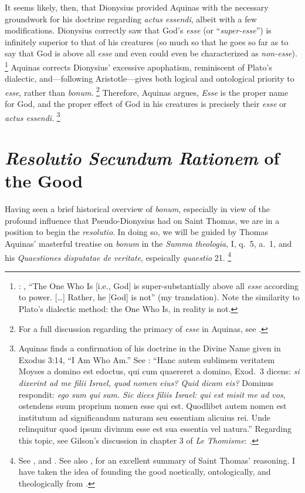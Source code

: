 {It seems likely, then, that Dionysius provided Aquinas with the necessary groundwork for his doctrine regarding \emph{actus essendi}, albeit with a few modifications.     Dionysius correctly saw that God's \emph{esse} (or ``\emph{super-esse}'') is infinitely superior to that of his creatures (so much so that he goes so far as to say that God is above all \emph{esse} and even could even be characterized as \emph{non-esse}).%
%
\footnote{\cite[V, 4]{pg:dionysius:DN}: , ``The One Who Is [i.e., God] is super-substantially above all \emph{esse} according to power. [\ldots] Rather, he [God] is not'' (my translation). Note the similarity to Plato's dialectic method: the One Who Is, in reality is not.}
%
Aquinas corrects Dionysius' excessive apophatism, reminiscent of Plato's dialectic, and---following Aristotle---gives both logical and ontological priority to \emph{esse}, rather than \emph{bonum}.%
%
\footnote{For a full discussion regarding the primacy of \emph{esse} in Aquinas, see \cite[109--113]{orourke:pseudo-dionysius}.} Therefore, Aquinas argues, \emph{Esse} is the proper name for God, and the proper effect of God in his creatures is precisely their \emph{esse} or \emph{actus essendi}.%
%
\footnote{Aquinas finds a confirmation of his doctrine in the Divine Name given in Exodus 3:14, ``I Am Who Am.'' See \cite[I, cap.~22, n.~10 (Marietti n.~211)]{st:contragent}:
``Hanc autem sublimem veritatem Moyses a domino est edoctus, qui cum quaereret a domino, Exod.~3 dicens: \emph{si dixerint ad me filii Israel, quod nomen eius? Quid dicam eis?} Dominus respondit: \emph{ego sum qui sum. Sic dices filiis Israel: qui est misit me ad vos}, ostendens suum proprium nomen esse qui est. Quodlibet autem nomen est institutum ad significandum naturam seu essentiam alicuius rei. Unde relinquitur quod ipsum divinum esse est sua essentia vel natura.''
Regarding this topic, see Gilson's discussion in chapter 3 of \emph{Le Thomisme}: \cite[99-112]{gilson:thomisme}.}

\begin{DONE}

\end{DONE}

\section{\emph{Resolutio Secundum Rationem} of the Good}

Having seen a brief historical overview of \emph{bonum}, especially in view of the profound influence that Pseudo-Dionysius had on Saint Thomas, we are in a position to begin the \emph{resolutio}. In doing so, we will be guided by Thomas Aquinas' masterful treatise on \emph{bonum} in the \emph{Summa theologia}, I, q.~5, a.~1, and his \emph{Quaestiones disputatae de veritate}, espeically \emph{quaestio} 21.%
%
\footnote{See \cite[I, q.~5, a.~1]{st:summa}, and \cite[q.~21]{st:deveritate}. See also \cite[63-69]{aertsen:good_as_transcendental}, for an excellent summary of Saint Thomas' reasoning. I have taken the idea of founding the good noetically, ontologically, and theologically from \cite{mitchell:transcendentals}.}

}
